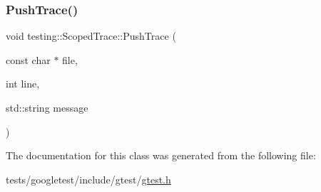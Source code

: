 \mbox{\label{classtesting_1_1ScopedTrace_a905304c342012d6ae1493a1ad3b62255}} 
\subsubsection{\texorpdfstring{Push\+Trace()}{PushTrace()}}
{\footnotesize\ttfamily void testing\+::\+Scoped\+Trace\+::\+Push\+Trace (\begin{DoxyParamCaption}\item[{const char $\ast$}]{file,  }\item[{int}]{line,  }\item[{std\+::string}]{message }\end{DoxyParamCaption})\hspace{0.3cm}{\ttfamily [private]}}



The documentation for this class was generated from the following file\+:\begin{DoxyCompactItemize}
\item 
tests/googletest/include/gtest/\hyperlink{gtest_8h}{gtest.\+h}\end{DoxyCompactItemize}
